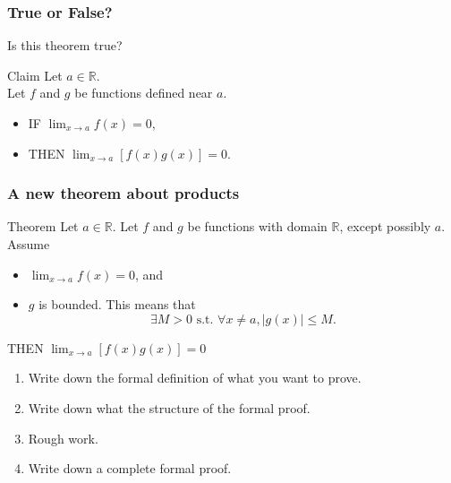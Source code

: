 \documentclass[14pt]{beamer}
\begin{document}
	\begin{frame}
		\frametitle{True or False?}

		\vfill

		Is this theorem true?

		\vfill

		\begin{block}{Claim}
			Let $a \in \mathbb{R}$. \\ Let $f$ and $g$ be functions defined near $a$. \\
			\begin{itemize}
				\item IF $\displaystyle \lim_{x \to a}f(x) = 0$,

				\item THEN $\displaystyle \lim_{x \to a}\left[ f(x) g(x) \right] = 0$.
			\end{itemize}
		\end{block}

		\vfill
	\end{frame}

	\begin{frame}[t]
		\frametitle{A new theorem about products}
		\fontsize{13}{13}\selectfont
		\begin{block}{Theorem}
			Let $a \in \mathbb{R}$. Let $f$ and $g$ be functions with domain
			$\mathbb{R}$, except possibly $a$. Assume
			\begin{itemize}
				\item $\displaystyle \lim_{x \to a}f(x) = 0$, and

				\item $g$ is bounded. This means that
					\[
						\exists M >0 \text{ s.t. }\forall x \neq a, |g(x)| \leq M.
					\]
			\end{itemize}
			THEN $\displaystyle \lim_{x \to a}\left[ f(x) g(x) \right] = 0$
		\end{block}

		\vfill
		\begin{enumerate}

			\item Write down the formal definition of what you want to prove.

			\item Write down what the structure of the formal proof.

			\item Rough work.

			\item Write down a complete formal proof.
		\end{enumerate}
		\vfill
	\end{frame}
\end{document}
